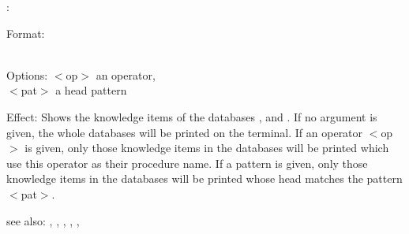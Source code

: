 :

Format: \\
        \\

Options: $<$op$>$ an operator,\\
         $<$pat$>$ a head pattern

Effect: Shows the knowledge items of the databases , 
	and . If no argument is given, the whole databases 
	will be printed on the terminal. If an operator $<$op$>$ is given, only those 
	knowledge items in the databases will be printed which use this operator
	as their procedure name. If a pattern is given, only those knowledge 
	items in the databases will be printed whose head matches the pattern 
	$<$pat$>$.

see also: , , , , , 
	  \consult
